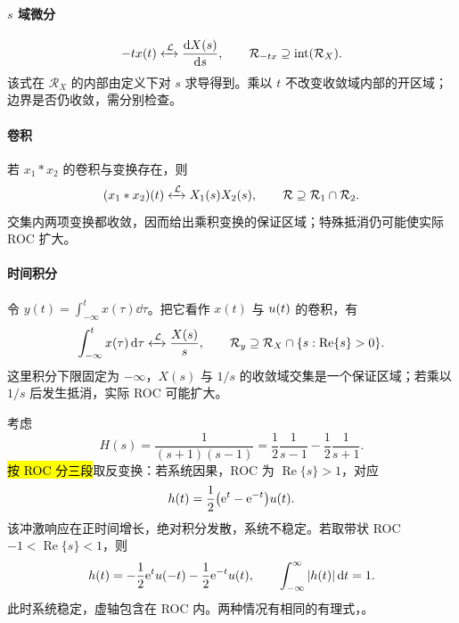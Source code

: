 \paragraph{$s$ 域微分}
\begin{equation}
  -t x(t)
  \mathrel{\xleftrightarrow{\,\mathcal{L}\,}} \frac{\mathop{}\!\mathrm{d} X(s)}{\mathop{}\!\mathrm{d} s},
  \qquad
  \mathcal R_{-tx}\supseteq\operatorname{int}(\mathcal R_X).
  \label{eq:laplace-s-differentiation}
\end{equation}
该式在 $\mathcal R_X$ 的内部由定义下对 $s$ 求导得到。乘以 $t$ 不改变收敛域内部的开区域；边界是否仍收敛，需分别检查。

\paragraph{卷积}
若 $x_1*x_2$ 的卷积与变换存在，则
\begin{equation}
  (x_1*x_2)(t)
  \mathrel{\xleftrightarrow{\,\mathcal{L}\,}} X_1(s)X_2(s),
  \qquad
  \mathcal R\supseteq\mathcal R_1\cap\mathcal R_2.
  \label{eq:laplace-convolution}
\end{equation}
交集内两项变换都收敛，因而给出乘积变换的保证区域；特殊抵消仍可能使实际 ROC 扩大。

\paragraph{时间积分}
令 $y(t)=\int_{-\infty}^{t}x(\tau)\dd\tau$。把它看作 $x(t)$ 与 $u(t)$ 的卷积，有
\begin{equation}
  \int_{-\infty}^{t}x(\tau)\mathop{}\!\mathrm{d}\tau
  \mathrel{\xleftrightarrow{\,\mathcal{L}\,}} \frac{X(s)}{s},
  \qquad
  \mathcal R_y\supseteq
  \mathcal R_X\cap\{s:\operatorname{Re}\{s\}>0\}.
  \label{eq:laplace-time-integration}
\end{equation}
这里积分下限固定为 $-\infty$，$X(s)$ 与 $1/s$ 的收敛域交集是一个保证区域；若乘以 $1/s$ 后发生抵消，实际 ROC 可能扩大。

\begin{example}[同一有理式的稳定与不稳定实现]
  考虑
  \[
    H(s)=\frac{1}{(s+1)(s-1)}
        =\frac12\frac{1}{s-1}-\frac12\frac{1}{s+1}.
  \]
  \hl{按 ROC 分三段}取反变换：若系统因果，ROC 为 $\operatorname{Re}\{s\}>1$，对应
  \[
    h(t)=\frac12\bigl(\mathrm{e}^t-\mathrm{e}^{-t}\bigr)u(t).
  \]
  该冲激响应在正时间增长，绝对积分发散，系统不稳定。若取带状 ROC
  $-1<\operatorname{Re}\{s\}<1$，则
  \[
    h(t)=-\frac12\mathrm{e}^tu(-t)-\frac12\mathrm{e}^{-t}u(t),
    \qquad
    \int_{-\infty}^{\infty}|h(t)|\mathop{}\!\mathrm{d} t=1.
  \]
  此时系统稳定，虚轴包含在 ROC 内。两种情况有相同的有理式，。
\end{example}

